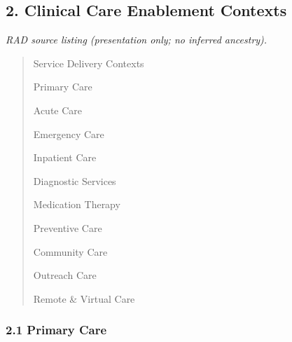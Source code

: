 \label{rad:sd:28}

\par\smallskip
{}\label{rad:sd:30}
\subsection*{2. Clinical Care Enablement Contexts}
\label{rad:sd:32}

\textit{RAD source listing (presentation only; no inferred ancestry).}
\begin{quote}
Service Delivery Contexts

Primary Care

Acute Care

Emergency Care

Inpatient Care

Diagnostic Services

Medication Therapy

Preventive Care

Community Care

Outreach Care

Remote \& Virtual Care
\end{quote}
\label{rad:sd:46}

\par\smallskip
{}\label{rad:sd:48}



\label{rad:sd:50}
\subsubsection*{2.1 Primary Care}
\label{rad:sd:51}

